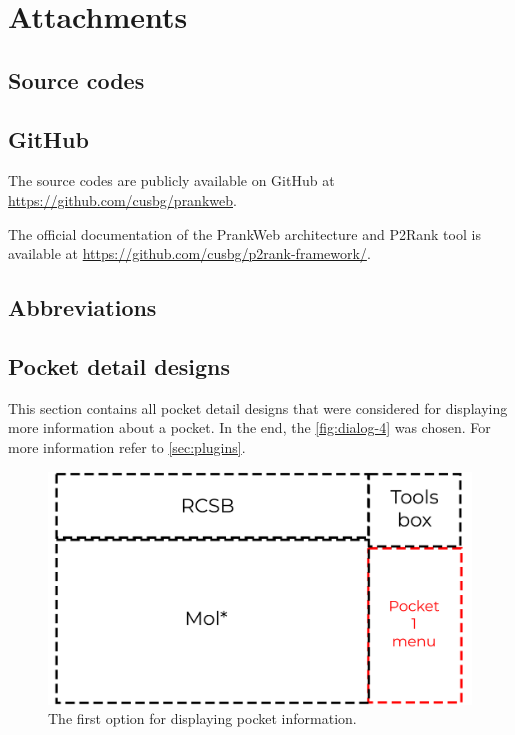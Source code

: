 \chapter{Attachments}

\section{Source codes}
\label{sec:source_codes}

\section{GitHub}
\label{sec:github}

The source codes are publicly available on GitHub at \url{https://github.com/cusbg/prankweb}.

The official documentation of the PrankWeb architecture and P2Rank tool is available at \url{https://github.com/cusbg/p2rank-framework/}.

\section{Abbreviations}
\label{sec:abbreviations}

\section{Pocket detail designs}
\label{sec:pocket_detail_designs}

This section contains all pocket detail designs that were considered for displaying more information about a pocket. In the end, the \cref{fig:dialog-4} was chosen. For more information refer to \cref{sec:plugins}.

\begin{figure}
    \centering
    \includegraphics[width=1\linewidth]{img/dialog_1-svg.pdf}
    \caption{The first option for displaying pocket information.}
    \label{fig:figure-1}
\end{figure}

